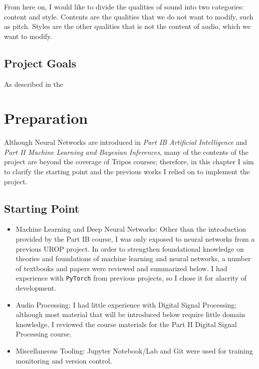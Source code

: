 \documentclass[12pt,a4paper,]{report}
\begin{document}
From here on, I would like to divide the qualities of sound into two
categories: content and style. Contents are the qualities that we do not
want to modify, such as pitch. Styles are the other qualities that is
not the content of audio, which we want to modify.

\hypertarget{project-goals}{%
\section{Project Goals}\label{project-goals}}

As described in the

\hypertarget{preparation}{%
\chapter{Preparation}\label{preparation}}

Although Neural Networks are introduced in \emph{Part IB Artificial
Intelligence} and \emph{Part II Machine Learning and Bayesian
Inferences}, many of the contents of the project are beyond the coverage
of Tripos courses; therefore, in this chapter I aim to clarify the
starting point and the previous works I relied on to implement the
project.

\hypertarget{starting-point}{%
\section{Starting Point}\label{starting-point}}

\begin{itemize}
\item
  Machine Learning and Deep Neural Networks: Other than the introduction
  provided by the Part IB course, I was only exposed to neural networks
  from a previous UROP project. In order to strengthen foundational
  knowledge on theories and foundations of machine learning and neural
  networks, a number of textbooks and papers were reviewed and
  summarized below. I had experience with \texttt{PyTorch} from previous
  projects, so I chose it for alacrity of development.
\item
  Audio Processing: I had little experience with Digital Signal
  Processing; although most material that will be introduced below
  require little domain knowledge, I reviewed the course materials for
  the Part II Digital Signal Processing course.
\item
  Miscellaneous Tooling: Jupyter Notebook/Lab and Git were used for
  training monitoring and version control.
\end{itemize}
\end{document}
